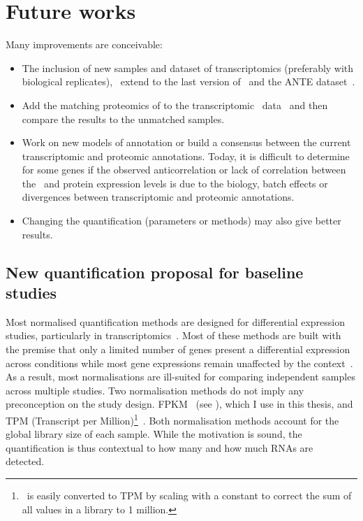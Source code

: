 \section*{Future works}
Many improvements are conceivable:
\vspace{-3mm}
\begin{itemize}[topsep=0pt,nosep]
        \item The inclusion of new samples and dataset of transcriptomics
            (preferably with biological replicates),
            \eg\ extend to the last version of \gtex\ and
            the ANTE dataset~.
        \item Add the matching proteomics of \citet{Wang2019-ut}
            to the transcriptomic \uhlen\ data~
            and then compare the results to the unmatched samples.
        \item Work on new models of annotation or
            build a consensus between the current transcriptomic and proteomic
            annotations.
            Today, it is difficult to determine for some genes
            if the observed anticorrelation or lack of correlation
            between the \mRNA\ and protein expression levels is due to the biology,
            batch effects or divergences between transcriptomic and
            proteomic annotations.
        \item Changing the quantification (parameters or methods)
            may also give better results.
\end{itemize}

\subsection*{New quantification proposal for baseline studies}
Most normalised quantification methods are designed
for differential expression studies,
particularly in transcriptomics~.
Most of these methods are built with the premise
that only a limited number of genes present a differential expression across conditions
while most gene expressions remain unaffected by the context~.
As a result, most normalisations are ill-suited
for comparing independent samples across multiple studies.
Two normalisation methods do not imply any preconception on the study design.
\gls{FPKM}~ (see ),
which I use in this thesis,
and TPM (Transcript per Million)\footnote{%
\FPKM\ is easily converted to TPM by scaling with a constant
to correct the sum of all values in a library to 1 million.
}~.
Both normalisation methods account for the global library size of each sample.
While the motivation is sound,
the quantification is thus contextual
to %
how many
and how much \glspl{RNA} are detected.\mybr\

